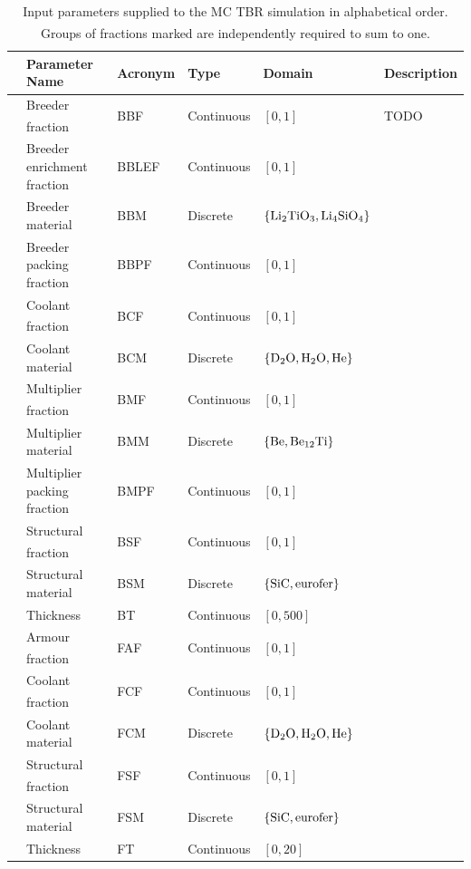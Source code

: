 \begin{table}[h]
	\centering
	{\footnotesize
		\begin{tabular}{l|lllll}
		\toprule
		{} & Parameter Name & Acronym & Type & Domain & Description\\
		\midrule
		\parbox[t]{2mm}{}
		   & Breeder fraction\textsuperscript{\textdagger} & BBF & Continuous & $[0,1]$ & TODO\\
		   & Breeder  enrichment fraction & BBLEF & Continuous & $[0,1]$ & {}\\
		   & Breeder material & BBM & Discrete & $\{\ce{Li2TiO3}, \ce{Li4SiO4}\}$ & {}\\
		   & Breeder packing fraction & BBPF & Continuous & $[0,1]$ & {}\\
		   & Coolant fraction\textsuperscript{\textdagger} & BCF & Continuous & $[0,1]$ & {}\\
		   & Coolant material & BCM & Discrete & $\{\ce{D2O}, \ce{H2O}, \ce{He}\}$ & {}\\
		   & Multiplier fraction\textsuperscript{\textdagger} & BMF & Continuous & $[0,1]$ & {}\\
		   & Multiplier material & BMM & Discrete & $\{\ce{Be}, \ce{Be12Ti}\}$ & {}\\
		   & Multiplier packing fraction & BMPF & Continuous & $[0,1]$ & {}\\
		   & Structural fraction\textsuperscript{\textdagger} & BSF & Continuous & $[0,1]$ & {}\\
		   & Structural material & BSM & Discrete & $\{\ce{SiC}, \text{eurofer}\}$ & {}\\
		   & Thickness & BT & Continuous & $[0,500]$ & {}\\
		\midrule
		\parbox[t]{2mm}{}
		   & Armour fraction\textsuperscript{\textdaggerdbl} & FAF & Continuous & $[0,1]$ & {}\\
		   & Coolant fraction\textsuperscript{\textdaggerdbl} & FCF & Continuous & $[0,1]$ & {}\\
		   & Coolant material & FCM & Discrete & $\{\ce{D2O}, \ce{H2O}, \ce{He}\}$ & {}\\
		   & Structural fraction\textsuperscript{\textdaggerdbl} & FSF & Continuous & $[0,1]$ & {}\\
		   & Structural material & FSM & Discrete & $\{\ce{SiC}, \text{eurofer}\}$ & {}\\
		   & Thickness & FT & Continuous & $[0,20]$ & {}\\
		\bottomrule
		\end{tabular}
	}
	\caption{Input parameters supplied to the MC TBR simulation in alphabetical
		order. Groups of fractions marked\textsuperscript{\textdagger
		\textdaggerdbl} are independently required to sum to one.}
	\label{tbl:params}
\end{table}

